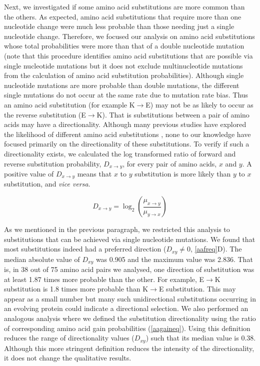 \documentclass[12pt,a4paper]{article}
\begin{document}
Next, we investigated if some amino acid substitutions are more common than the others. As expected, amino acid substitutions that require more than one nucleotide change were much less probable than those needing just a single nucleotide change. Therefore, we focused our analysis on amino acid substitutions whose total probabilities were more than that of a double nucleotide mutation (note that this procedure identifies amino acid substitutions that are possible via single nucleotide mutations but it does not exclude multinucleotide mutations from the calculation of amino acid substitution probabilities). Although single nucleotide mutations are more probable than double mutations, the different single mutations do not occur at the same rate due to mutation rate bias. Thus an amino acid substitution (for example K$\to$E) may not be as likely to occur as the reverse substitution (E$\to$K). That is substitutions between a pair of amino acids may have a directionality. Although many previous studies have explored the likelihood of different amino acid substitutions \citep{aasubOhta,PAM,blosum,submat92,submat92j,submat01,submat05,submat07,submat08}, none to our knowledge have focused primarily on the directionality of these substitutions. To verify if such a directionality exists, we calculated the log transformed ratio of forward and reverse substitution probability, $D_{x\to y}$, for every pair of amino acids, $x$ and $y$. A positive value of $D_{x\to y}$ means that $x$ to $y$ substitution is more likely than $y$ to $x$ substitution, and \textit{vice versa}.

\begin{equation}
\textit{D}_{x\to y} = \log_2\left(\frac{\mu_{x\to y}}{\mu_{y\to x}}\right)
\label{directionality}
\end{equation}

As we mentioned in the previous paragraph, we restricted this analysis to substitutions that can be achieved via single nucleotide mutations. We found that most substitutions indeed had a preferred direction ($\textit{D}_{xy} \neq 0$,  \autoref{aafreq}{\color{blue}D}). The median absolute value of $\textit{D}_{xy}$ was 0.905 and the maximum value was 2.836. That is, in 38 out of 75 amino acid pairs we analysed, one direction of substitution was at least 1.87 times more probable than the other. For example, E$\to$K substitution is 1.8 times more probable than K$\to$E substitution. This may appear as a small number but many such unidirectional substitutions occurring in an evolving protein could indicate a directional selection. We also performed an analogous analysis where we defined the substitution directionality using the ratio of corresponding amino acid gain probabilities (\autoref{aagaineq}). Using this definition reduces the range of directionality values ($\textit{D}_{xy}$) such that its median value is 0.38. Although this more stringent definition reduces the intensity of the directionality, it does not change the qualitative results.
\end{document}
